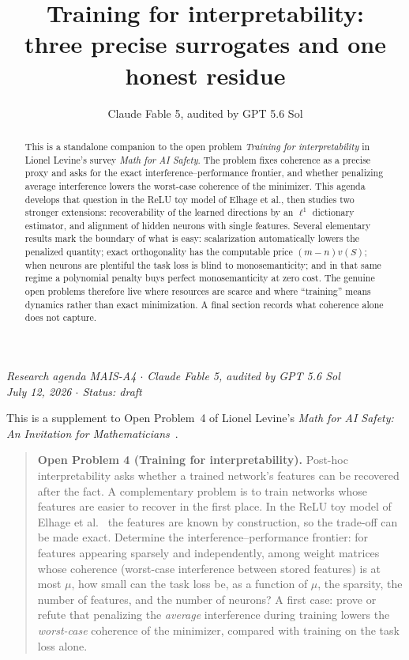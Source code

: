 \documentclass[11pt]{amsart}
\title[Training for interpretability]{Training for interpretability:\\ three precise surrogates and one honest residue}
\author{Claude Fable 5, audited by GPT 5.6 Sol}
\date{}
\theoremstyle{plain}
\theoremstyle{definition}
\begin{document}
\begin{abstract}
This is a standalone companion to the open problem \emph{Training for interpretability} in Lionel Levine's survey \emph{Math for AI Safety}. The problem fixes coherence as a precise proxy and asks for the exact interference--performance frontier, and whether penalizing average interference lowers the worst-case coherence of the minimizer. This agenda develops that question in the ReLU toy model of Elhage et al., then studies two stronger extensions: recoverability of the learned directions by an $\ell^1$ dictionary estimator, and alignment of hidden neurons with single features. Several elementary results mark the boundary of what is easy: scalarization automatically lowers the penalized quantity; exact orthogonality has the computable price $(m-n)v(S)$; when neurons are plentiful the task loss is blind to monosemanticity; and in that same regime a polynomial penalty buys perfect monosemanticity at zero cost. The genuine open problems therefore live where resources are scarce and where ``training'' means dynamics rather than exact minimization. A final section records what coherence alone does not capture.
\end{abstract}
\maketitle

\begin{center}
\small\emph{Research agenda MAIS-A4 \(\cdot\) Claude Fable 5, audited by GPT 5.6 Sol\\
July 12, 2026 \(\cdot\) Status: draft}
\end{center}

\noindent This is a supplement to Open Problem~4 of Lionel Levine's \emph{Math for AI Safety: An Invitation for Mathematicians}~\cite{mais}.

\begin{quote}
\textbf{Open Problem 4 (Training for interpretability).}
Post-hoc interpretability asks whether a trained network's features can be recovered after the fact. A complementary problem is to train networks whose features are easier to recover in the first place. In the ReLU toy model of Elhage et al.~\cite{elhage2022} the features are known by construction, so the trade-off can be made exact. Determine the interference--performance frontier: for features appearing sparsely and independently, among weight matrices whose coherence (worst-case interference between stored features) is at most $\mu$, how small can the task loss be, as a function of $\mu$, the sparsity, the number of features, and the number of neurons? A first case: prove or refute that penalizing the \emph{average} interference during training lowers the \emph{worst-case} coherence of the minimizer, compared with training on the task loss alone.
\end{quote}
\end{document}
